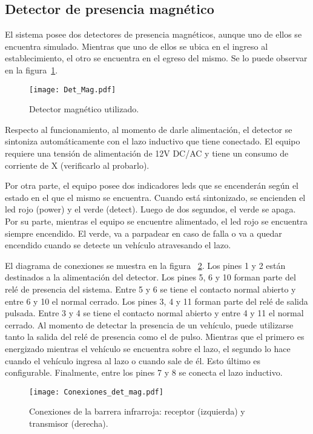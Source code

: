 \subsection{Detector de presencia magnético}

El sistema posee dos detectores de presencia magnéticos, aunque uno de ellos se encuentra simulado. Mientras que uno de ellos se ubica en el ingreso al establecimiento, el otro se encuentra en el egreso del mismo. Se lo puede observar en la figura~\ref{fig:img_Det_Mag}.

\begin{figure}[H]
	\centering
	\texttt{[image: Det\_Mag.pdf]}
	\caption{Detector magnético utilizado.}
	\label{fig:img_Det_Mag}
\end{figure}

Respecto al funcionamiento, al momento de darle alimentación, el detector se sintoniza automáticamente con el lazo inductivo que tiene conectado. El equipo requiere una tensión de alimentación de 12V DC/AC y \textcolor{mGreen}{tiene un consumo de corriente de X (verificarlo al probarlo)}.

Por otra parte, el equipo posee dos indicadores leds que se encenderán según el estado en el que el mismo se encuentra. Cuando está sintonizado, se encienden el led rojo (power) y el verde (detect). Luego de dos segundos, el verde se apaga. Por su parte, mientras el equipo se encuentre alimentado, el led rojo se encuentra siempre encendido. El verde, va a parpadear en caso de falla o va a quedar encendido cuando se detecte un vehículo atravesando el lazo.

El diagrama de conexiones se muestra en la figura ~\ref{fig:img_Conexiones_det_mag}. Los pines 1 y 2 están destinados a la alimentación del detector. Los pines 5, 6 y 10 forman parte del relé de presencia del sistema. Entre 5 y 6 se tiene el contacto normal abierto y entre 6 y 10 el normal cerrado. Los pines 3, 4 y 11 forman parte del relé de salida pulsada. Entre 3 y 4 se tiene el contacto normal abierto y entre 4 y 11 el normal cerrado. Al momento de detectar la presencia de un vehículo, puede utilizarse tanto la salida del relé de presencia como el de pulso. Mientras que el primero es energizado mientras el vehículo se encuentra sobre el lazo, el segundo lo hace cuando el vehículo ingresa al lazo o cuando sale de él. Esto último es configurable. Finalmente, entre los pines 7 y 8 se conecta el lazo inductivo.

\begin{figure}[H]
	\centering
	\texttt{[image: Conexiones\_det\_mag.pdf]}
	\caption{Conexiones de la barrera infrarroja: receptor (izquierda) y transmisor (derecha).}
	\label{fig:img_Conexiones_det_mag}
\end{figure}

